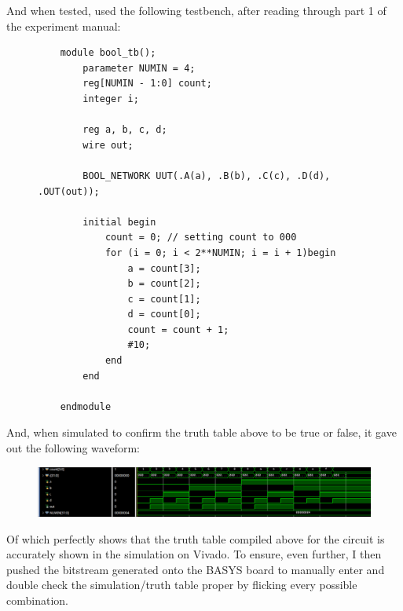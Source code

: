 And when tested, used the following testbench, after reading through part 1 of the experiment manual:
\begin{figure}[!htbp]
    \centering
    \begin{verbatim}
    module bool_tb();
        parameter NUMIN = 4;
        reg[NUMIN - 1:0] count;
        integer i;
        
        reg a, b, c, d;
        wire out;
        
        BOOL_NETWORK UUT(.A(a), .B(b), .C(c), .D(d), .OUT(out));
        
        initial begin
            count = 0; // setting count to 000
            for (i = 0; i < 2**NUMIN; i = i + 1)begin
                a = count[3];
                b = count[2];
                c = count[1];
                d = count[0];
                count = count + 1;
                #10;
            end
        end
        
    endmodule
    \end{verbatim}
\end{figure}\newline
And, when simulated to confirm the truth table above to be true or false, it gave out the following waveform:
\begin{figure}[!htbp]
    \centering
    \caption{}
    \includegraphics[width=1\textwidth]{part-2-wave.png}
    \label{Figure 2}
\end{figure}\newline
Of which perfectly shows that the truth table compiled above for the circuit is accurately shown in the simulation on Vivado. To ensure, even further, I then pushed the bitstream generated onto the BASYS board to manually enter and double check the simulation/truth table proper by flicking every possible combination.
\newpage
